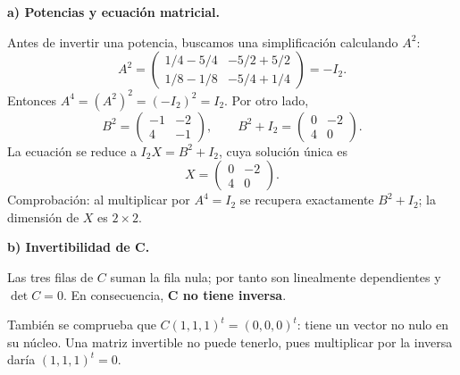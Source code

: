 \textbf{a) Potencias y ecuación matricial.}\par\nopagebreak[4]
Antes de invertir una potencia, buscamos una simplificación calculando $A^2$:
\[
A^2=\begin{pmatrix}
1/4-5/4&-5/2+5/2\\
1/8-1/8&-5/4+1/4
\end{pmatrix}=-I_2.
\]
Entonces $A^4=(A^2)^2=(-I_2)^2=I_2$. Por otro lado,
\[
B^2=\begin{pmatrix}-1&-2\\4&-1\end{pmatrix},\qquad
B^2+I_2=\begin{pmatrix}0&-2\\4&0\end{pmatrix}.
\]
La ecuación se reduce a $I_2X=B^2+I_2$, cuya solución única es
\[
\boxed{X=\begin{pmatrix}0&-2\\4&0\end{pmatrix}.}
\]
Comprobación: al multiplicar por $A^4=I_2$ se recupera exactamente $B^2+I_2$; la dimensión de $X$ es $2\times2$.

\textbf{b) Invertibilidad de C.}\par\nopagebreak[4]
Las tres filas de $C$ suman la fila nula; por tanto son linealmente dependientes y $\det C=0$. En consecuencia, \textbf{C no tiene inversa}.

También se comprueba que $C(1,1,1)^t=(0,0,0)^t$: tiene un vector no nulo en su núcleo. Una matriz invertible no puede tenerlo, pues multiplicar por la inversa daría $(1,1,1)^t=0$.
